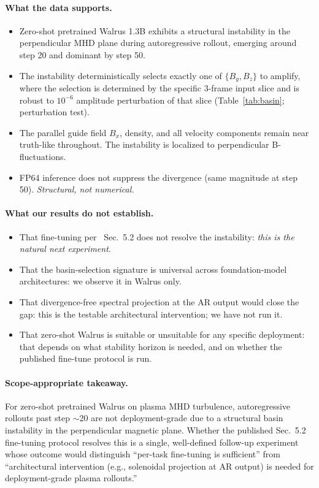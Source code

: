 \documentclass{article}
\begin{document}
\paragraph{What the data supports.}
\begin{itemize}
  \setlength\itemsep{0.2em}
  \item Zero-shot pretrained Walrus 1.3B exhibits a structural instability in the perpendicular MHD plane during autoregressive rollout, emerging around step 20 and dominant by step 50.
  \item The instability deterministically selects exactly one of $\{B_y, B_z\}$ to amplify, where the selection is determined by the specific 3-frame input slice and is robust to $10^{-6}$ amplitude perturbation of that slice (Table~\ref{tab:basin}; perturbation test).
  \item The parallel guide field $B_x$, density, and all velocity components remain near truth-like throughout. The instability is localized to perpendicular B-fluctuations.
  \item FP64 inference does not suppress the divergence (same magnitude at step 50). \emph{Structural, not numerical.}
\end{itemize}

\paragraph{What our results do not establish.}
\begin{itemize}
  \setlength\itemsep{0.2em}
  \item That fine-tuning per~\cite{mccabe2025walrus} Sec.~5.2 does not resolve the instability: \emph{this is the natural next experiment}.
  \item That the basin-selection signature is universal across foundation-model architectures: we observe it in Walrus only.
  \item That divergence-free spectral projection at the AR output would close the gap: this is the testable architectural intervention; we have not run it.
  \item That zero-shot Walrus is suitable or unsuitable for any specific deployment: that depends on what stability horizon is needed, and on whether the published fine-tune protocol is run.
\end{itemize}

\paragraph{Scope-appropriate takeaway.} For zero-shot pretrained Walrus on plasma MHD turbulence, autoregressive rollouts past step $\sim$20 are not deployment-grade due to a structural basin instability in the perpendicular magnetic plane. Whether the published Sec.~5.2 fine-tuning protocol resolves this is a single, well-defined follow-up experiment whose outcome would distinguish ``per-task fine-tuning is sufficient'' from ``architectural intervention (e.g., solenoidal projection at AR output) is needed for deployment-grade plasma rollouts.''

\small


\end{document}
